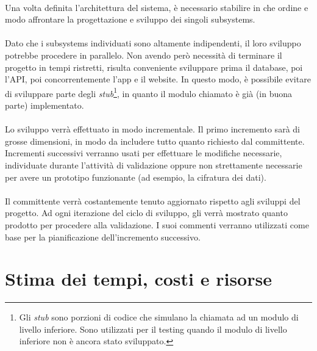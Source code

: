 \documentclass[12pt,a4paper,twoside,english,italian]{book}
\begin{document}
\paragraph{} Una volta definita l'architettura del sistema, è necessario stabilire in che ordine e modo affrontare la progettazione e sviluppo dei singoli subsystems. 

\paragraph{} Dato che i subsystems individuati sono altamente indipendenti, il loro sviluppo potrebbe procedere in parallelo. Non avendo però necessità di terminare il progetto in tempi ristretti, risulta conveniente sviluppare prima il database, poi l'API, poi concorrentemente l'app e il website. In questo modo, è possibile evitare di sviluppare parte degli \emph{stub}\footnote{Gli \emph{stub} sono porzioni di codice che simulano la chiamata ad un modulo di livello inferiore. Sono utilizzati per il testing quando il modulo di livello inferiore non è ancora stato sviluppato.}, in quanto il modulo chiamato è già (in buona parte) implementato.

\paragraph{} Lo sviluppo verrà effettuato in modo incrementale. Il primo incremento sarà di grosse dimensioni, in modo da includere tutto quanto richiesto dal committente. Incrementi successivi verranno usati per effettuare le modifiche necessarie, individuate durante l'attività di validazione oppure non strettamente necessarie per avere un prototipo funzionante (ad esempio, la cifratura dei dati). 

\newpage

\paragraph{} Il committente verrà costantemente tenuto aggiornato rispetto agli sviluppi del progetto. Ad ogni iterazione del ciclo di sviluppo, gli verrà mostrato quanto prodotto per procedere alla validazione. I suoi commenti verranno utilizzati come base per la pianificazione dell'incremento successivo.

\section{Stima dei tempi, costi e risorse}
\end{document}
